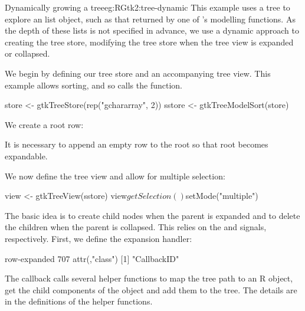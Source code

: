 \begin{example}{Dynamically growing a tree}{eg:RGtk2:tree-dynamic}
This example uses a tree to explore an \R\/ list object, such as that
returned by one of \R's modelling functions.  As the depth of these
lists is not specified in advance, we use a dynamic approach to
creating the tree store, modifying the tree store when the tree view
is expanded or collapsed.
  

We begin by defining our tree store and an accompanying tree
view. This example allows sorting, and so calls the
 function.
\begin{Schunk}
\begin{Sinput}
 store <- gtkTreeStore(rep("gchararray", 2))
 sstore <- gtkTreeModelSort(store)
\end{Sinput}
\end{Schunk}

We create a root row:
\begin{Schunk}
\end{Schunk}
%
It is necessary to append an empty row to the root so that root
becomes expandable.

We now define the tree view and allow for multiple selection:
\begin{Schunk}
\begin{Sinput}
 view <- gtkTreeView(sstore)
 view$getSelection()$setMode("multiple")
\end{Sinput}
\end{Schunk}

The basic idea is to create child nodes when the parent is expanded
and to delete the children when the parent is collapsed. This relies
on the  and  signals,
respectively. First, we define the expansion handler:
\begin{Schunk}
\begin{Soutput}
row-expanded 
         707 
attr(,"class")
[1] "CallbackID"
\end{Soutput}
\end{Schunk}
%
The callback calls several helper functions to map the tree path to an
R object, get the child components of the object and add them to the
tree. The details are in the definitions of the helper functions.


\end{example}
